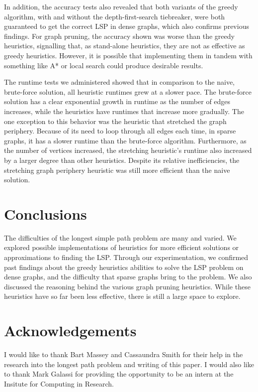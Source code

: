 \documentclass[twocolumn,showpacs,%
  nofootinbib,aps,superscriptaddress,%
  eqsecnum,prd,notitlepage,showkeys,11pt]{article}
\begin{document}
In addition, the accuracy tests also revealed that both variants of the greedy algorithm, with and without the depth-first-search tiebreaker, were both guaranteed to get the correct LSP in dense graphs, which also confirms previous findings. For graph pruning, the accuracy shown was worse than the greedy heuristics, signalling that, as stand-alone heuristics, they are not as effective as greedy heuristics. However, it is possible that implementing them in tandem with something like A* or local search could produce desirable results.

The runtime tests we administered showed that in comparison to the naive, brute-force solution, all heuristic runtimes grew at a slower pace. The brute-force solution has a clear exponential growth in runtime as the number of edges increases, while the heuristics have runtimes that increase more gradually. The one exception to this behavior was the heuristic that stretched the graph periphery. Because of its need to loop through all edges each time, in sparse graphs, it has a slower runtime than the brute-force algorithm. Furthermore, as the number of vertices increased, the stretching heuristic's runtime also increased by a larger degree than other heuristics. Despite its relative inefficiencies, the stretching graph periphery heuristic was still more efficient than the naive solution.


\section{Conclusions}

The difficulties of the longest simple path problem are many and varied.
We explored possible implementations of heuristics for more efficient solutions or approximations to finding the LSP. Through our experimentation, we confirmed past findings about the greedy heuristics abilities to solve the LSP problem on dense graphs, and the difficulty that sparse graphs bring to the problem. We also discussed the reasoning behind the various graph pruning heuristics. While these heuristics have so far been less effective, there is still a large space to explore.

\section*{Acknowledgements}

I would like to thank Bart Massey and Cassaundra Smith for their help in the research into the longest path problem and writing of this paper. I would also like to thank Mark Galassi for providing the opportunity to be an intern at the Insitute for Computing in Research.



\end{document}
